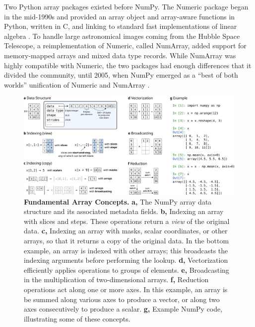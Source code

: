 Two Python array packages existed before NumPy.
The Numeric package began in the mid-1990s and provided an array object and array-aware functions
in Python, written in C, and linking to standard fast implementations of linear
algebra \cite{Numericmanual}.
To handle large astronomical images coming from the Hubble Space Telescope,
a reimplementation of Numeric, called NumArray, added
support for memory-mapped arrays and mixed data type records. 
While NumArray was highly compatible with Numeric, the two packages
had enough differences that it divided the community, until
2005, when NumPy emerged as a ``best of both worlds'' unification of Numeric
and NumArray \cite{oliphant2006guide}.

\begin{figure}[h]
  \centering
  \includegraphics[width=\textwidth]{static/sketches/concepts}
  \caption{\textbf{Fundamental Array Concepts.}
    \textbf{a,} The NumPy array data structure and its associated metadata fields.
    \textbf{b,} Indexing an array with slices and steps. These
  operations return a \emph{view} of the original data.
    \textbf{c,} Indexing an array with masks, scalar coordinates, or
  other arrays, so that it returns a copy of the original data. In the
  bottom example, an array is indexed with other arrays; this broadcasts the indexing arguments before performing the lookup.
    \textbf{d,} Vectorization efficiently applies operations to groups
  of elements.
    \textbf{e,} Broadcasting in the multiplication of two-dimensional arrays.
    \textbf{f,} Reduction operations act along one or more axes. In this
    example, an array is be summed along various axes to produce a vector, or along two axes consecutively to
    produce a scalar.
    \textbf{g,} Example NumPy code, illustrating some of these concepts.
   }
  \label{fig:array-concepts}
\end{figure}

